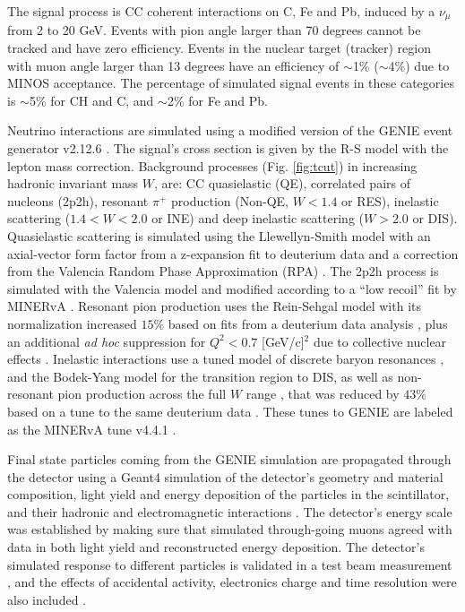 \documentclass[aps,prl,twocolumn,superscriptaddress,nofootinbib]{revtex4-1}
\begin{document}
\par The signal process is CC coherent interactions on C, Fe and Pb, induced by a $\nu_{\mu}$ from 2 to
20 GeV. Events with pion angle larger than 70 degrees cannot be tracked and have zero efficiency. Events
in the nuclear target (tracker) region with muon angle larger than 13 degrees have an efficiency of 
$\sim$1\% ($\sim$4\%) due to MINOS acceptance. The percentage of simulated signal events in these 
categories is $\sim$5\% for CH and C, and $\sim$2\% for Fe and Pb. 

\par Neutrino interactions are simulated using a modified version of the {\small GENIE} event generator
v2.12.6 \cite{Andreopoulos:2009rq, Andreopoulos:2015wxa}. The signal's cross section is given by the R-S
model with the lepton mass correction. Background processes (Fig. \ref{fig:tcut}) in increasing hadronic
invariant mass $W$, are: CC quasielastic (QE), correlated pairs of nucleons (2p2h), resonant $\pi^{+}$ 
production (Non-QE, $W\!<\!1.4$ or RES), inelastic scattering ($1.4\!<\!W\!<\!2.0$ or INE) and deep 
inelastic scattering ($W\!>\!2.0$ or DIS). Quasielastic scattering is simulated using the Llewellyn-Smith
model \cite{LlewellynSmith:1971uhs} with an axial-vector form factor from a z-expansion fit to deuterium
data \cite{Meyer:2016oeg} and a correction from the Valencia Random Phase Approximation (RPA) 
\cite{Nieves:2004wx}. The 2p2h process is simulated with the Valencia model \cite{Nieves:2011pp, Gran:2013kda, Schwehr:2016pvn}
and modified according to a ``low recoil'' fit by MINERvA \cite{MINERvA:2015ydy}. Resonant pion production
uses the Rein-Sehgal model \cite{Rein:1980wg} with its normalization increased $15\%$ based on fits from
a deuterium data analysis \cite{Rodrigues:2016xjj}, plus an additional {\it ad hoc} suppression for 
$Q^{2}\!<\!0.7$ [GeV/c]$^{2}$ due to collective nuclear effects \cite{MINERvA:2019kfr}. Inelastic 
interactions use a tuned model of discrete baryon resonances \cite{Rein:1980wg}, and the Bodek-Yang model
for the transition region to DIS, as well as non-resonant pion production across the full $W$ range 
\cite{Bodek:2004pc}, that was reduced by $43\%$ based on a tune to the same deuterium data \cite{Rodrigues:2016xjj}. 
These tunes to {\small GENIE} are labeled as the MINERvA tune v4.4.1 \cite{MINERvA:2022mnw}.

\par Final state particles coming from the {\small GENIE} simulation are propagated through the detector
using a {\small Geant4} simulation of the detector's geometry and material composition, light yield and
energy deposition of the particles in the scintillator, and their hadronic and electromagnetic interactions
\cite{Kaidalov:1982xg, Guthrie:1968ue}. The detector's energy scale was established by making sure that 
simulated through-going muons agreed with data in both light yield and reconstructed energy deposition. 
The detector's simulated response to different particles is validated in a test beam measurement 
\cite{MINERvA:2015yej}, and the effects of accidental activity, electronics charge and time resolution
were also included \cite{MINERvA:2013zvz}. 
\end{document}
